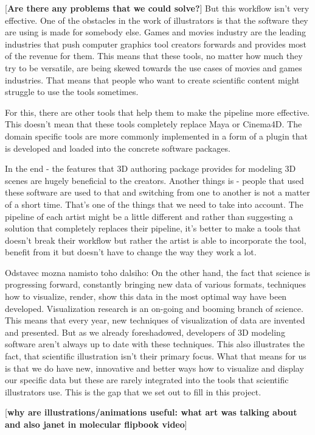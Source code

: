 \documentclass[
  digital, %
  table,   %
  nolof,     %
  nolot,     %
]{fithesis3}
\begin{document}
[\textbf{Are there any problems that we could solve?}]
But this workflow isn't very effective. One of the obstacles in the work of illustrators is that the software they are using is made for somebody else. Games and movies industry are the leading industries that push computer graphics tool creators forwards and provides most of the revenue for them. This means that these tools, no matter how much they try to be versatile, are being skewed towards the use cases of movies and games industries. That means that people who want to create scientific content might struggle to use the tools sometimes.

For this, there are other tools that help them to make the pipeline more effective. This doesn't mean that these tools completely replace Maya or Cinema4D. The domain specific tools are more commonly implemented in a form of a plugin that is developed and loaded into the concrete software packages.

In the end - the features that 3D authoring package provides for modeling 3D scenes are hugely beneficial to the creators. Another things is - people that used these software are used to that and switching from one to another is not a matter of a short time. That's one of the things that we need to take into account. The pipeline of each artist might be a little different and rather than suggesting a solution that completely replaces their pipeline, it's better to make a tools that doesn't break their workflow but rather the artist is able to incorporate the tool, benefit from it but doesn't have to change the way they work a lot.

Odstavec mozna namisto toho dalsiho: On the other hand, the fact that science is progressing forward, constantly bringing new data of various formats, techniques how to visualize, render, show this data in the most optimal way have been developed. Visualization research is an on-going and booming branch of science. This means that every year, new techniques of visualization of data are invented and presented. But as we already foreshadowed, developers of 3D modeling software aren't always up to date with these techniques. This also illustrates the fact, that scientific illustration isn't their primary focus. What that means for us is that we do have new, innovative and better ways how to visualize and display our specific data but these are rarely integrated into the tools that scientific illustrators use. This is the gap that we set out to fill in this project.

[\textbf{why are illustrations/animations useful: what art was talking about and also janet in molecular flipbook video}]
\end{document}
